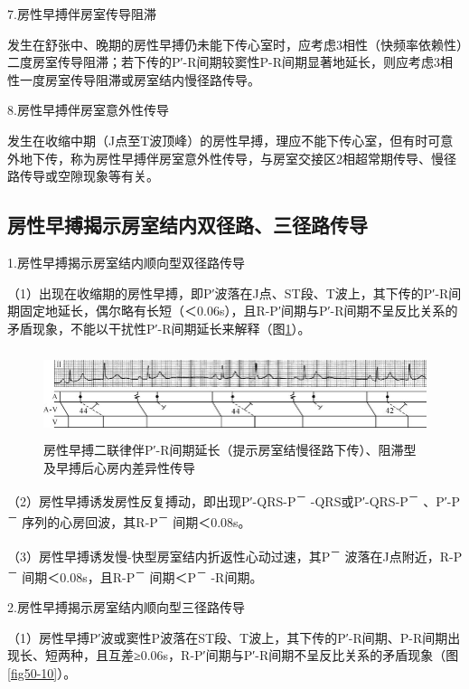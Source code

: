 7.房性早搏伴房室传导阻滞

发生在舒张中、晚期的房性早搏仍未能下传心室时，应考虑3相性（快频率依赖性）二度房室传导阻滞；若下传的P′-R间期较窦性P-R间期显著地延长，则应考虑3相性一度房室传导阻滞或房室结内慢径路传导。

8.房性早搏伴房室意外性传导

发生在收缩中期（J点至T波顶峰）的房性早搏，理应不能下传心室，但有时可意外地下传，称为房性早搏伴房室意外性传导，与房室交接区2相超常期传导、慢径路传导或空隙现象等有关。

\protect\hypertarget{text00018.htmlux5cux23subid139}{}{}

\subsection{房性早搏揭示房室结内双径路、三径路传导}

1.房性早搏揭示房室结内顺向型双径路传导

（1）出现在收缩期的房性早搏，即P′波落在J点、ST段、T波上，其下传的P′-R间期固定地延长，偶尔略有长短（＜0.06s），且R-P′间期与P′-R间期不呈反比关系的矛盾现象，不能以干扰性P′-R间期延长来解释（图\ref{fig11-11}）。

\begin{figure}[!htbp]
 \centering
 \includegraphics[width=5.73958in,height=1in]{./images/Image00163.jpg}
 \captionsetup{justification=centering}
 \caption{房性早搏二联律伴P′-R间期延长（提示房室结慢径路下传）、阻滞型及早搏后心房内差异性传导}
 \label{fig11-11}
  \end{figure} 

（2）房性早搏诱发房性反复搏动，即出现P′-QRS-P\textsuperscript{－}
-QRS或P′-QRS-P\textsuperscript{－} 、P′-P\textsuperscript{－}
序列的心房回波，其R-P\textsuperscript{－} 间期＜0.08s。

（3）房性早搏诱发慢-快型房室结内折返性心动过速，其P\textsuperscript{－}
波落在J点附近，R-P\textsuperscript{－}
间期＜0.08s，且R-P\textsuperscript{－} 间期＜P\textsuperscript{－}
-R间期。

2.房性早搏揭示房室结内顺向型三径路传导

（1）房性早搏P′波或窦性P波落在ST段、T波上，其下传的P′-R间期、P-R间期出现长、短两种，且互差≥0.06s，R-P′间期与P′-R间期不呈反比关系的矛盾现象（图\ref{fig50-10}）。

